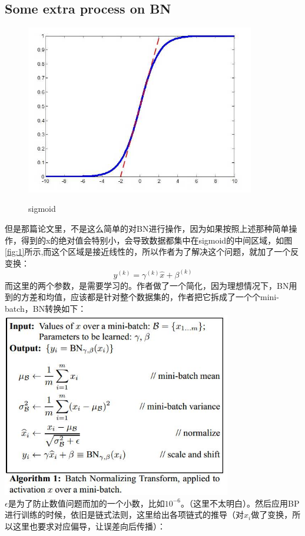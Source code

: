 \documentclass{article}
\begin{document}
\subsection{Some extra process on BN}
\begin{figure}
  \centering
  \includegraphics[width=10cm]{sigmoid}\\
  \caption{sigmoid}\label{fig:1}
\end{figure}
但是那篇论文里，不是这么简单的对BN进行操作，因为如果按照上述那种简单操作，得到的x的绝对值会特别小，会导致数据都集中在sigmoid的中间区域，如图\eqref{fig:1}所示,而这个区域是接近线性的，所以作者为了解决这个问题，就加了一个反变换：
$$
y^{(k)}=\gamma^{(k)}\widehat{x}+\beta^{(k)}
$$
而这里的两个参数，是需要学习的。作者做了一个简化，因为理想情况下，BN用到的方差和均值，应该都是针对整个数据集的，作者把它拆成了一个个mini-batch，BN转换如下：\\
\includegraphics[width=10cm]{BN}
\\$\epsilon$是为了防止数值问题而加的一个小数，比如$10^{-6}$。（这里不太明白）。然后应用BP进行训练的时候，依旧是链式法则，这里给出各项链式的推导（对$x_{i}$做了变换，所以这里也要求对应偏导，让误差向后传播）：\\
\end{document}
